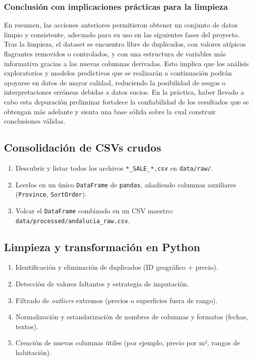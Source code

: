 \documentclass[a4paper,11pt]{book}
\begin{document}
\subsubsection{Conclusión con implicaciones prácticas para la limpieza}
En resumen, las acciones anteriores permitieron obtener un conjunto de datos limpio y consistente, adecuado para su uso en las siguientes fases del proyecto. Tras la limpieza, el dataset se encuentra libre de duplicados, con valores atípicos flagrantes removidos o controlados, y con una estructura de variables más informativa gracias a las nuevas columnas derivadas. Esto implica que los análisis exploratorios y modelos predictivos que se realizarán a continuación podrán apoyarse en datos de mayor calidad, reduciendo la posibilidad de sesgos o interpretaciones erróneas debidas a datos sucios. En la práctica, haber llevado a cabo esta depuración preliminar fortalece la confiabilidad de los resultados que se obtengan más adelante y sienta una base sólida sobre la cual construir conclusiones válidas.

\subsection{Consolidación de CSVs crudos}

\begin{enumerate}
    \item Descubrir y listar todos los archivos \texttt{*\_SALE\_*.csv} en \texttt{data/raw/}.
    \item Leerlos en un único \texttt{DataFrame} de \texttt{pandas}, añadiendo columnas auxiliares (\texttt{Province}, \texttt{SortOrder}).
    \item Volcar el \texttt{DataFrame} combinado en un CSV maestro: \texttt{data/processed/andalucia\_raw.csv}.
\end{enumerate}

\subsection{Limpieza y transformación en Python}

\begin{enumerate}
    \item Identificación y eliminación de duplicados (ID geográfico + precio).
    \item Detección de valores faltantes y estrategia de imputación.
    \item Filtrado de \textit{outliers} extremos (precios o superficies fuera de rango).
    \item Normalización y estandarización de nombres de columnas y formatos (fechas, textos).
    \item Creación de nuevas columnas útiles (por ejemplo, precio por m², rangos de habitación).
\end{enumerate}
\end{document}

